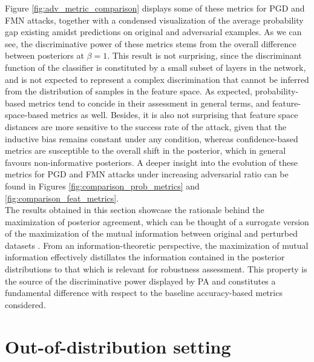 Figure \ref{fig:adv_metric_comparison} displays some of these metrics for
PGD and FMN attacks, together with a condensed visualization of the average 
probability gap existing amidst predictions on original and adversarial examples. As
we can see, the discriminative power of these metrics stems from the overall difference 
between posteriors at $\beta = 1$. This result is not surprising, since the discriminant function 
of the classifier is constituted by a small subset of layers in the network, and is not expected 
to represent a complex discrimination that cannot be inferred from the distribution 
of samples in the feature space. As expected, probability-based metrics tend to concide in 
their assessment in general terms, and feature-space-based metrics as well. Besides, it is also not
surprising that feature space distances are more sensitive to the success rate of the attack, 
given that the inductive bias remains constant under any condition, whereas confidence-based metrics
are susceptible to the overall shift in the posterior, which in general favours non-informative
posteriors. A deeper insight into the evolution of these metrics for PGD and FMN attacks under increasing
adversarial ratio can be found in Figures \ref{fig:comparison_prob_metrics} and 
\ref{fig:comparison_feat_metrics}. \\

The results obtained in this section showcase the rationale behind the maximization of posterior
agreement, which can be thought of a surrogate version of the maximization of the mutual information
between original and perturbed datasets
\cite{buhmannDataScienceAlgorithms2022}. From an information-theoretic perspective, 
the maximization of mutual information effectively
distillates the information contained in the posterior distributions to that 
which is relevant for robustness assessment. This property is the source of the 
discriminative power displayed by PA and constitutes a fundamental difference
with respect to the baseline accuracy-based metrics considered.


\section{Out-of-distribution setting}\label{results_domain_generalization}


